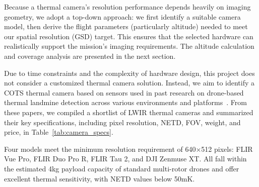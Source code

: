 Because a thermal camera’s resolution performance depends heavily on imaging geometry, we adopt a top-down approach: we first identify a suitable camera model, then derive the flight parameters (particularly altitude) needed to meet our spatial resolution (\gls{GSD}) target. This ensures that the selected hardware can realistically support the mission’s imaging requirements. The altitude calculation and coverage analysis are presented in the next section.

Due to time constraints and the complexity of hardware design, this project does not consider a customized thermal camera solution. Instead, we aim to identify a \gls{COTS} thermal camera based on sensors used in past research on drone-based thermal landmine detection across various environments and platforms~\cite{baur2020applying,nikulin2018detection,krause2018diurnal,TENORIOTAMAYO2024105567,FORERORAMIREZ2022104307,rs15040967,dena2020image,Fardoulis2020PROOFHS,butt2024uav,AgrawalChung2024ComparingSL,Popov2022MethodFM,TENORIOTAMAYO2023109443}. From these papers, we compiled a shortlist of \gls{LWIR} thermal cameras and summarized their key specifications, including pixel resolution, \gls{NETD}, \gls{FOV}, weight, and price, in Table~\ref{tab:camera_specs}.

Four models meet the minimum resolution requirement of 640×512 pixels: FLIR Vue Pro, FLIR Duo Pro R, FLIR Tau 2, and DJI Zenmuse XT. All fall within the estimated 4kg payload capacity of standard multi-rotor drones and offer excellent thermal sensitivity, with \gls{NETD} values below 50mK.


\renewcommand{\arraystretch}{0.9}
\setlength{\tabcolsep}{5pt}

